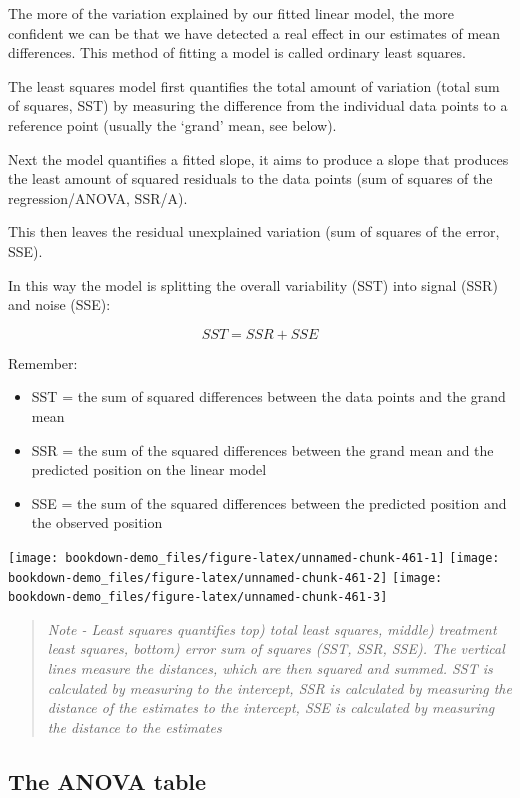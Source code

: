 \documentclass[
]{book}
\begin{document}
The more of the variation explained by our fitted linear model, the more confident we can be that we have detected a real effect in our estimates of mean differences. This method of fitting a model is called ordinary least squares.

The least squares model first quantifies the total amount of variation (total sum of squares, SST) by measuring the difference from the individual data points to a reference point (usually the `grand' mean, see below).

Next the model quantifies a fitted slope, it aims to produce a slope that produces the least amount of squared residuals to the data points (sum of squares of the regression/ANOVA, SSR/A).

This then leaves the residual unexplained variation (sum of squares of the error, SSE).

In this way the model is splitting the overall variability (SST) into signal (SSR) and noise (SSE):

\[ SST = SSR + SSE \]

Remember:

\begin{itemize}
\item
  SST = the sum of squared differences between the data points and the grand mean
\item
  SSR = the sum of the squared differences between the grand mean and the predicted position on the linear model
\item
  SSE = the sum of the squared differences between the predicted position and the observed position
\end{itemize}

\texttt{[image: bookdown-demo\_files/figure-latex/unnamed-chunk-461-1]}
\texttt{[image: bookdown-demo\_files/figure-latex/unnamed-chunk-461-2]}
\texttt{[image: bookdown-demo\_files/figure-latex/unnamed-chunk-461-3]}

\begin{quote}
\emph{Note - Least squares quantifies top) total least squares, middle) treatment least squares, bottom) error sum of squares (SST, SSR, SSE). The vertical lines measure the distances, which are then squared and summed. SST is calculated by measuring to the intercept, SSR is calculated by measuring the distance of the estimates to the intercept, SSE is calculated by measuring the distance to the estimates}
\end{quote}

\hypertarget{the-anova-table}{%
\subsection{The ANOVA table}\label{the-anova-table}}
\end{document}
